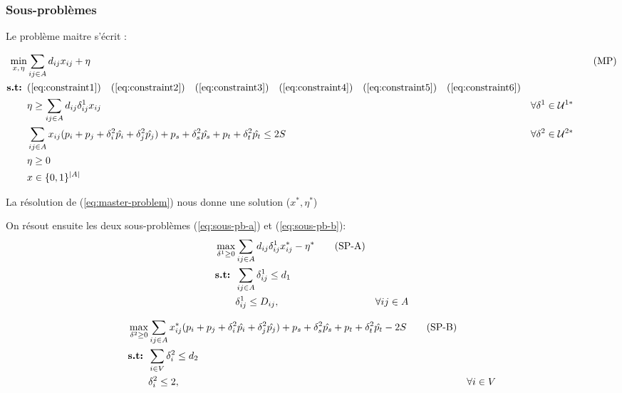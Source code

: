 \documentclass{article}
\begin{document}
\subsubsection{Sous-problèmes}
Le problème maitre s'écrit :

\begin{align}
  \min_{x, \hspace{1px} \eta } & \sum_{ij \in A} d_{ij} x_{ij} + \eta && \tag{MP} \label{eq:master-problem} \\
  \textbf{s.t: } & (\ref{eq:constraint1}) \quad (\ref{eq:constraint2}) \quad (\ref{eq:constraint3}) \quad (\ref{eq:constraint4}) \quad (\ref{eq:constraint5}) \quad (\ref{eq:constraint6}) \notag \\
  & \eta \geq \sum_{ij \in A} d_{ij} \delta_{ij}^{1} x_{ij} & \forall \delta^{1} \in \mathcal{U}^{1*} \\
  & \sum_{ij \in A} x_{ij}(p_i + p_j + \delta_{i}^{2} \hat{p_i} + \delta_{j}^{2} \hat{p_j}) + p_s + \delta_{s}^{2} \hat{p_s} + p_t + \delta_{t}^{2} \hat{p_t} \leq 2S & \forall \delta^{2} \in \mathcal{U}^{2*} \\
  & \eta \geq 0 \notag \\
  & x \in \{0,1\}^{|A|} \notag
\end{align}

La résolution de (\ref{eq:master-problem}) nous donne une solution ($x^*, \eta^*$)

On résout ensuite les deux sous-problèmes (\ref{eq:sous-pb-a}) et (\ref{eq:sous-pb-b}): 
\begin{align}
  \max_{\delta^{1} \geq 0} & \sum_{ij \in A} d_{ij} \delta_{ij}^{1} x^*_{ij} - \eta^* \tag{SP-A} \label{eq:sous-pb-a}\\
  \textbf{s.t: } & \sum_{ij \in A} \delta_{ij}^{1} \leq d_1 \notag \\
  &\delta_{ij}^{1} \leq D_{ij}, & \forall ij \in A \notag \\
\end{align}

\begin{align}
  \max_{\delta^{2} \geq 0} & \sum_{ij \in A} x^*_{ij}(p_i + p_j + \delta_{i}^{2} \hat{p_i} + \delta_{j}^{2} \hat{p_j}) + p_s + \delta_{s}^{2} \hat{p_s} + p_t + \delta_{t}^{2} \hat{p_t} - 2S \tag{SP-B} \label{eq:sous-pb-b}\\
  \textbf{s.t: } & \sum_{i \in V} \delta^{2}_{i} \leq d_2 \notag \\
  &\delta^{2}_{i} \leq 2, & \forall i \in V \notag
\end{align}
\end{document}
